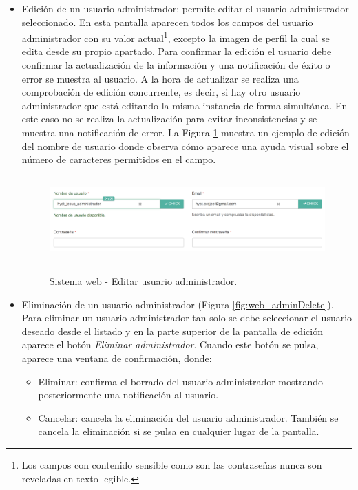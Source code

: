 \documentclass[12pt,a4paper, twoside]{report}
\begin{document}
\begin{itemize}
\begin{itemize}
		\end{itemize}
			
		\item Edición de un usuario administrador: permite editar el usuario administrador seleccionado. En esta pantalla aparecen todos los campos del usuario administrador con su valor actual\footnote{Los campos con contenido sensible como son las contraseñas nunca son reveladas en texto legible.}, excepto la imagen de perfil la cual se edita desde su propio apartado. Para confirmar la edición el usuario debe confirmar la actualización de la información y una notificación de éxito o error se muestra al usuario. A la hora de actualizar se realiza una comprobación de edición concurrente, es decir, si hay otro usuario administrador que está editando la misma instancia de forma simultánea. En este caso no se realiza la actualización para evitar inconsistencias y se muestra una notificación de error. La Figura \ref{fig:web_adminEdit} muestra un ejemplo de edición del nombre de usuario donde observa cómo aparece una ayuda visual sobre el número de caracteres permitidos en el campo.
				
			\begin{figure}[!ht]   
				\caption{Sistema web - Editar usuario administrador.} 
				\begin{center}
	 				\includegraphics[width=13cm, height=3.3cm]{Images/userGuide/web/adminEdit} \\
	 				\label{fig:web_adminEdit} 
				\end{center}  	
			\end{figure}

		\item Eliminación de un usuario administrador (Figura \ref{fig:web_adminDelete}). Para eliminar un usuario administrador tan solo se debe seleccionar el usuario deseado desde el listado y en la parte superior de la pantalla de edición aparece el botón \textit{Eliminar administrador}. Cuando este botón se pulsa, aparece una ventana de confirmación, donde:
		
			\begin{itemize}
				\item Eliminar: confirma el borrado del usuario administrador mostrando posteriormente una notificación al usuario.
				\item Cancelar: cancela la eliminación del usuario administrador. También se cancela la eliminación si se pulsa en cualquier lugar de la pantalla.
			\end{itemize}
			

\end{itemize}
\end{document}
